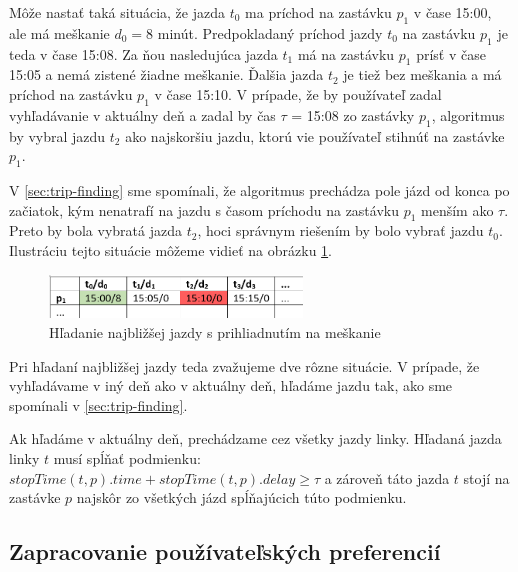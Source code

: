 Môže nastať taká situácia, že jazda $t_0$ ma príchod na zastávku $p_1$ v čase 15:00, ale má meškanie $d_0=8$ minút. Predpokladaný príchod jazdy $t_0$ na zastávku $p_1$ je teda v čase 15:08. Za ňou nasledujúca jazda $t_1$ má na zastávku $p_1$ prísť v čase 15:05 a nemá zistené žiadne meškanie. Ďalšia jazda $t_2$ je tiež bez meškania a má príchod na zastávku $p_1$ v čase 15:10. V prípade, že by používateľ zadal vyhľadávanie v aktuálny deň a zadal by čas $\tau$ = 15:08 zo zastávky $p_1$, algoritmus by vybral jazdu $t_2$ ako najskoršiu jazdu, ktorú vie používateľ stihnúť na zastávke $p_1$.

V \ref{sec:trip-finding} sme spomínali, že algoritmus prechádza pole jázd od konca po začiatok, kým nenatrafí na jazdu s časom príchodu na zastávku $p_1$ menším ako $\tau$. Preto by bola vybratá jazda $t_2$, hoci správnym riešením by bolo vybrať jazdu $t_0$. Ilustráciu tejto situácie môžeme vidieť na obrázku \ref{fig:shedule-delays}. 

\begin{figure}[H]
\centerline{\includegraphics[width=0.6\textwidth]{images/shedule-delays}}
\caption[Hľadanie najbližšej jazdy s prihliadnutím na meškanie]{Hľadanie najbližšej jazdy s prihliadnutím na meškanie}
\label{fig:shedule-delays}
\end{figure} 

Pri hľadaní najbližšej jazdy teda zvažujeme dve rôzne situácie. V prípade, že vyhľadávame v iný deň ako v aktuálny deň, hľadáme jazdu tak, ako sme spomínali v \ref{sec:trip-finding}. 

Ak hľadáme v aktuálny deň, prechádzame cez všetky jazdy linky. Hľadaná jazda linky $t$ musí spĺňať podmienku:
$stopTime(t, p).time + stopTime(t, p).delay \geq \tau$ a zároveň táto jazda $t$ stojí na zastávke $p$ najskôr zo všetkých jázd spĺňajúcich túto podmienku.

\subsection{Zapracovanie používateľských preferencií}
